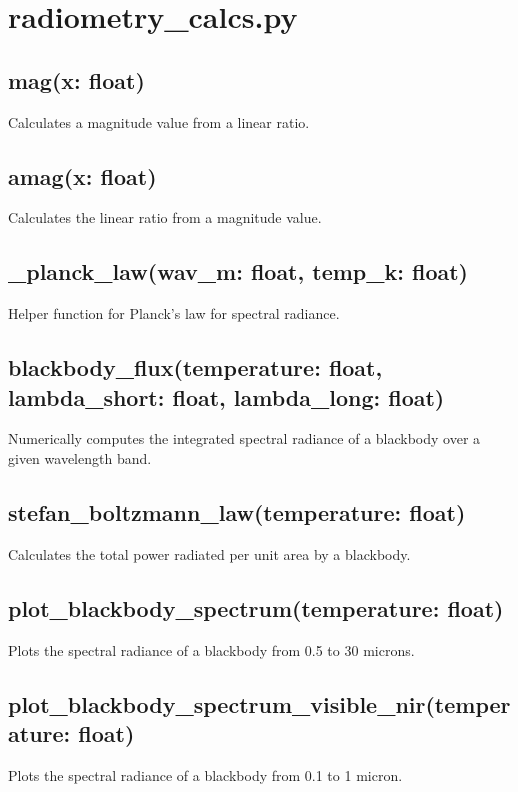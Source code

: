 \documentclass{article}
\begin{document}
\section*{radiometry\_calcs.py}
\subsection*{mag(x: float)}
Calculates a magnitude value from a linear ratio.
\subsection*{amag(x: float)}
Calculates the linear ratio from a magnitude value.
\subsection*{\_planck\_law(wav\_m: float, temp\_k: float)}
Helper function for Planck's law for spectral radiance.
\subsection*{blackbody\_flux(temperature: float, lambda\_short: float, lambda\_long: float)}
Numerically computes the integrated spectral radiance of a blackbody over a given wavelength band.
\subsection*{stefan\_boltzmann\_law(temperature: float)}
Calculates the total power radiated per unit area by a blackbody.
\subsection*{plot\_blackbody\_spectrum(temperature: float)}
Plots the spectral radiance of a blackbody from 0.5 to 30 microns.
\subsection*{plot\_blackbody\_spectrum\_visible\_nir(temperature: float)}
Plots the spectral radiance of a blackbody from 0.1 to 1 micron.
\end{document}
